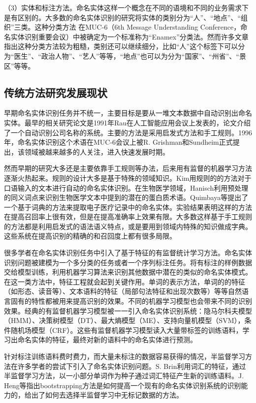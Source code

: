 \documentclass[winfonts,master,oneside,nobackinfo]{njuthesis}
\begin{document}
（3）实体和标注方法。命名实体这样一个概念在不同的语境和不同的业务需求下是有区别的。大多数的命名实体识别的研究将实体的类别分为“人”、“地点”、“组织”三类。这种分类方法 在MUC-6（6th Message Understanding Conference，命名实体识别重要会议）中被确定为一个标准称为“Enamex”分类法。然而许多文章指出这种分类方法较为粗糙，类别还可以继续细分，比如“人”这个标签下可以分为“医生”、“政治人物”、“艺人”等等，“地点”也可以为分为“国家”、“州省”、“景区”等等。

\subsection{传统方法研究发展现状}
早期命名实体识别任务并不统一，主要目标是要从一堆文本数据中自动识别出命名实体。最早的相关研究论文是1991年Rau\cite{Rau}在人工智能应用会议上发表的，论文介绍了一个自动识别公司名称的系统。主要的方法是采用启发式方法和手工规则。1996年，命名实体识别这个术语在MUC-6会议上被R. Grishman和Sundheim正式提出，该领域被越来越多的人关注，进入快速发展时期。

然而早期的研究大多还是主要依靠手工规则等办法，后来用有监督的机器学习方法逐渐火热起来。规则的设计大多是基于特殊的领域知识。Kim\cite{Kim}用规则的的方法对于口语输入的文本进行自动的命名实体识别。在生物医学领域，Hanisch\cite{Hanisch}利用预处理的同义词点来识别生物医学文本中提到的潜在的蛋白质术语。Quimbaya\cite{Quimbaya}等提出了一个基于词典的方法来提取电子医疗记录中的命名实体。实验结果表明这样的方法在提高召回率上很有效，但是在提高准确率上效果有限。大多数这样基于手工规则的方法都是利用启发式的语法语义特点，或是要用到领域内特殊的知识做成字典。这些系统在提高识别的精确的和召回度上都有很多局限。

很多学者在命名实体识别任务中引入了基于特征的有监督统计学习方法。命名实体识别问题被建模为一个多分类的任务或者一个序列标注任务。将有标注的样例数据交给模型训练，利用机器学习算法来识别其他数据中潜在的类似的命名实体模式。在这一类方法中，特征工程就会起到关键作用。单词的表示方法\cite{Nadeau}，单词的的特征（如形态、读音等）\cite{Settles}、文本语料的特征（局部句法特征和出现次数等）\cite{Ravin}等等自然语言固有的特性都被用来提高识别的效果。不同的机器学习模型也会带来不同的识别效果。经典的有监督机器学习模型被一一引入命名实体识别系统：隐马尔科夫模型（HMM）\cite{Eddy}、决策树模型（DT）\cite{Quinlan}、最大熵模型（ME）\cite{Kapur}、支持向量机模型（SVM）\cite{Hearst}，条件随机场模型（CRF）\cite{Lafferty}。这些有监督机器学习模型读入大量带标签的训练语料，学习出命名实体的特征，最终对新的语料中的命名实体进行预测。

针对标注训练语料费时费力，而大量未标注的数据容易获得的情况，半监督学习方法在许多学者的尝试下引入了命名实体识别问题。S. Brin\cite{Brin}利用词汇的特征，通过半监督学习方法，以一小部分单词作为种子通过词汇特征产生新的训练语料。J. Heng\cite{Heng}等指出bootstrapping方法是如何提高一个现有的命名实体识别系统的识别能力的，给出了如何去选择半监督学习中无标记数据的方法。
\end{document}
